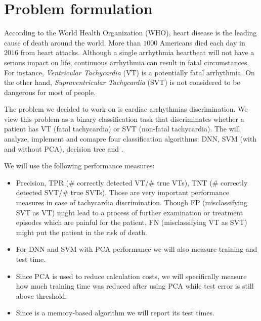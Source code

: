 \section{Problem  formulation}
\label{sec:problem}

According to the World Health Organization (WHO), heart disease is 
the leading cause of death around the world.
More than $1000$ Americans died each day in $2016$ from heart 
attacks. 
Although a single arrhythmia heartbeat will not have a serious impact 
on life, continuous arrhythmia can result in fatal circumstances.
For instance, \textit{Ventricular Tachycardia} (VT) is a potentially 
fatal arrhythmia. 
On the other hand, \textit{Supraventricular Tachycardia} (SVT)
is not considered to be dangerous for most of people. 

The problem we decided to work on is cardiac arrhythmias 
discrimination. We view this problem as a binary classification task 
that discriminates whether a patient has VT (fatal tachycardia) or  
SVT (non-fatal tachycardia). The will analyze, implement and comapre 
four classification algorithms: DNN, SVM (with and without 
PCA), 
decision tree and \knn.



We will use the following performance measures:
\begin{itemize}
	\item Precision, 
	TPR ($\#$ correctly detected VT/$\#$ true VTs), 
	TNT ($\#$ correctly detected SVT/$\#$ true SVTs). 
	Those are very important performance measures in case of 
	tachycardia discrimination. Though FP (misclassifying SVT as VT) 
	might lead 	to a 	process of further examination or treatment 
	episodes which are 
	painful for the patient, FN (misclassifying VT as SVT) might put 
	the patient in the risk of death.  
	\item For DNN and SVM with PCA performance we will also measure 
	training 
	and test time.
	\item Since PCA is used to reduce calculation costs, we will 
	specifically 
	measure how much training time was reduced after using PCA while 
	test error is still above threshold. 
	\item Since \knn is a memory-based algorithm we will report its 
	test times. 
\end{itemize}


